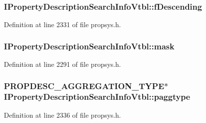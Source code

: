 \subsubsection[{\texorpdfstring{f\+Descending}{fDescending}}]{ I\+Property\+Description\+Search\+Info\+Vtbl\+::f\+Descending}\hypertarget{struct_i_property_description_search_info_vtbl_aa3fedbba1f6540b2d5569167d2a94ac2}{}\label{struct_i_property_description_search_info_vtbl_aa3fedbba1f6540b2d5569167d2a94ac2}


Definition at line 2331 of file propsys.\+h.

\subsubsection[{\texorpdfstring{mask}{mask}}]{ I\+Property\+Description\+Search\+Info\+Vtbl\+::mask}\hypertarget{struct_i_property_description_search_info_vtbl_ac2d257b3188e337de97f6d4cf429d9af}{}\label{struct_i_property_description_search_info_vtbl_ac2d257b3188e337de97f6d4cf429d9af}


Definition at line 2291 of file propsys.\+h.

\subsubsection[{\texorpdfstring{paggtype}{paggtype}}]{ {\bf P\+R\+O\+P\+D\+E\+S\+C\+\_\+\+A\+G\+G\+R\+E\+G\+A\+T\+I\+O\+N\+\_\+\+T\+Y\+PE}$\ast$ I\+Property\+Description\+Search\+Info\+Vtbl\+::paggtype}\hypertarget{struct_i_property_description_search_info_vtbl_a493080cf12a30b1c35e1014bc731800e}{}\label{struct_i_property_description_search_info_vtbl_a493080cf12a30b1c35e1014bc731800e}


Definition at line 2336 of file propsys.\+h.


